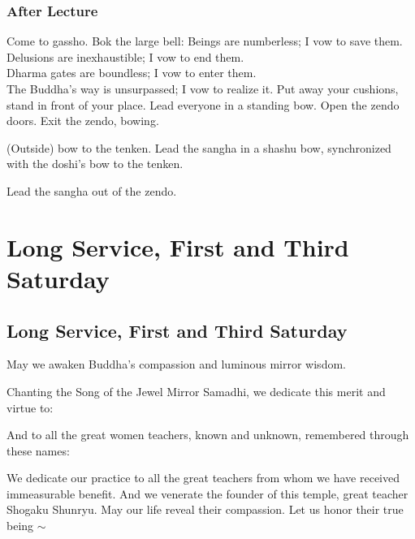 \documentclass{chantbook}
\begin{document}
\section*{After Lecture}
\doshi Come to gassho.
\doan Bok the large bell: \bigspace\bok
\sangha Beings are numberless; I vow to save them.\\
Delusions are inexhaustible; I vow to end them.\\
Dharma gates are boundless; I vow to enter them.\\
The Buddha's way is unsurpassed; I vow to realize it.
\sangha Put away your cushions, stand in front of your place.
\doshi Lead everyone in a standing bow.
\tenken Open the zendo doors.
\doshi Exit the zendo, bowing.

(Outside) bow to the tenken.
\doan Lead the sangha in a shashu bow, synchronized with the doshi's bow to
the tenken.

Lead the sangha out of the zendo.

\part{Long Service, First and Third Saturday}
\chapter{Long Service, First and Third Saturday}
\begin{service}
\kokyo \makaHannyaHaramittaShingyo
\kokyo \enmeiJukkuKannonGyo
\kokyo {}
\sangha \allBuddhas
\kokyo \songOfTheJewelMirrorSamadhi
\kokyo May we awaken Buddha's compassion and luminous mirror wisdom.

Chanting the Song of the Jewel Mirror Samadhi, we dedicate this merit and
virtue to: \bigspace\clank

\ancestorsShort

\kokyo And to all the great women teachers, known and unknown, remembered
through these names: \bigspace\clank

\femaleAncestors

\kokyo We dedicate our practice to all the great teachers from whom we have
received immeasurable benefit. And we venerate the founder of this temple,
great teacher Shogaku Shunryu. May our life reveal their compassion. Let us
honor their true being $\sim$ \largebell
\end{service}
\end{document}
